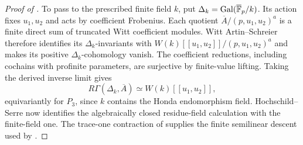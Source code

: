 \begin{proof}[Proof of ]
To pass to the prescribed finite field $k$, put
$\Delta_k=\operatorname{Gal}(\overline{\mathbb F}_p/k)$.  Its action fixes $u_1,u_2$
and acts by coefficient Frobenius.  Each quotient
$\overline A/(p,u_1,u_2)^a$ is a finite direct sum of truncated
Witt coefficient modules.  Witt Artin--Schreier therefore identifies
its $\Delta_k$-invariants with
$W(k)[[u_1,u_2]]/(p,u_1,u_2)^a$ and makes its positive
$\Delta_k$-cohomology vanish.  The coefficient reductions, including
cochains with profinite parameters, are surjective by finite-value
lifting.  Taking the derived inverse limit gives
\[
 R\Gamma(\Delta_k,\overline A)\simeq W(k)[[u_1,u_2]],
\]
equivariantly for $P_3$, since $k$ contains the Honda endomorphism
field.  Hochschild--Serre now identifies the algebraically closed
residue-field calculation with the finite-field one.  The trace-one
contraction of  supplies the finite
semilinear descent used by .


\end{proof}
